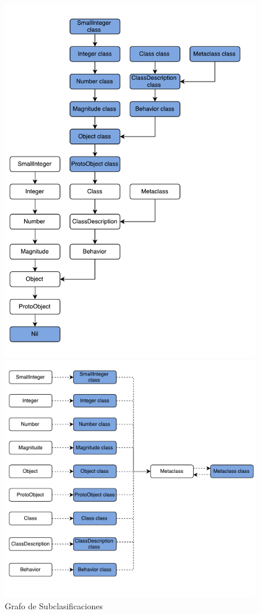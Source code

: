 \begin{figure}[H]
\centering
\begin{minipage}{.5\textwidth}
  \centering
  \includegraphics[width=\linewidth]{images/metamodelo_superclases.pdf}
  \caption{Grafo de Subclasificaciones}
  \label{fig:sub1}
\end{minipage}%
\begin{minipage}{.5\textwidth}
  \centering
  \includegraphics[width=1.2\linewidth]{images/metamodelo_instancia_de.pdf}

\end{minipage}
\end{figure}
